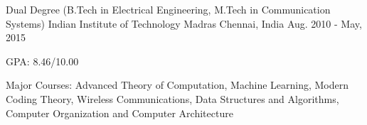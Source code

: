 \begin{cventries}
	\cventry
	{Dual Degree (B.Tech in Electrical Engineering, M.Tech in Communication Systems)}
	{Indian Institute of Technology Madras}
	{Chennai, India}
	{Aug. 2010 - May, 2015}
	{
		\begin{cvitems}
		\item{GPA: 8.46/10.00}
		\item{Major Courses: Advanced Theory of Computation, Machine Learning, Modern Coding Theory, Wireless Communications, Data Structures and Algorithms, Computer Organization and Computer Architecture}
		\end{cvitems}
	}
\end{cventries}

